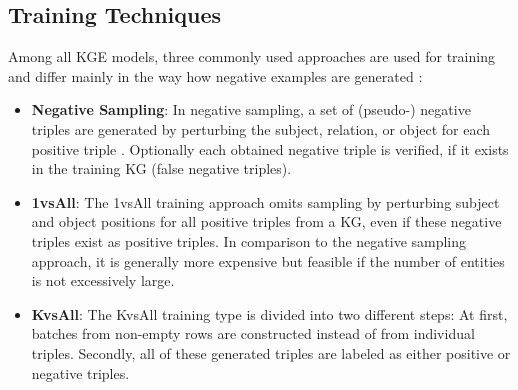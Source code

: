\subsection{Training Techniques}
\label{subsec:training_techniques}
%
Among all \ac{KGE} models, three commonly used approaches are used for training and differ mainly in the way how negative examples are generated \cite{Ruffinelli2020You}:
\begin{itemize}
    \item  
    \textbf{Negative Sampling}:
    In negative sampling, a set of (pseudo-) negative triples are generated by perturbing the subject, relation, or object for each positive triple .
    Optionally each obtained negative triple is verified, if it exists in the training \ac{KG} (false negative triples).
    
    \item  
    \textbf{1vsAll}:
    The 1vsAll training approach omits sampling by perturbing subject and object positions for all positive triples from a \ac{KG}, even if these negative triples exist as positive triples.
    In comparison to the negative sampling approach, it is generally more expensive but feasible if the number of entities is not excessively large.
        
    \item  
    \textbf{KvsAll}: 
    The KvsAll training type is divided into two different steps:
    At first, batches from non-empty rows are constructed instead of from individual triples.
    Secondly, all of these generated triples are labeled as either positive or negative triples.
\end{itemize}
\clearpage